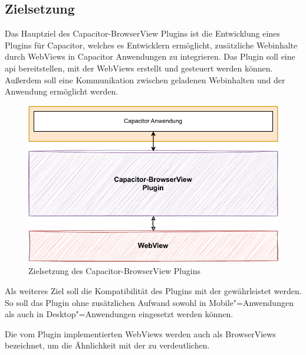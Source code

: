 
\subsection{Zielsetzung}

Das Hauptziel des Capacitor-BrowserView Plugins ist die Entwicklung eines Plugins für Capacitor, welches es Entwicklern ermöglicht, zusätzliche Webinhalte durch WebViews in Capacitor Anwendungen zu integrieren.
Das Plugin soll eine \ac{api} bereitstellen, mit der WebViews erstellt und gesteuert werden können.
Außerdem soll eine Kommunikation zwischen geladenen Webinhalten und der Anwendung ermöglicht werden.

\begin{figure}[H]
    \centering
    \includegraphics[width=\textwidth]{assets/03_Capacitor-BrowserView/01_Zielsetzung.drawio.pdf}
    \caption[Capacitor-BrowserView / Zielsetzung]{Zielsetzung des Capacitor-BrowserView Plugins}
\end{figure}

Als weiteres Ziel soll die Kompatibilität des Plugins mit der  gewährleistet werden.
So soll das Plugin ohne zusätzlichen Aufwand sowohl in Mobile"=Anwendungen als auch in Desktop"=Anwendungen eingesetzt werden können.

Die vom Plugin implementierten WebViews werden auch als BrowserViews bezeichnet, um die Ähnlichkeit mit der  zu verdeutlichen.

\printfn
